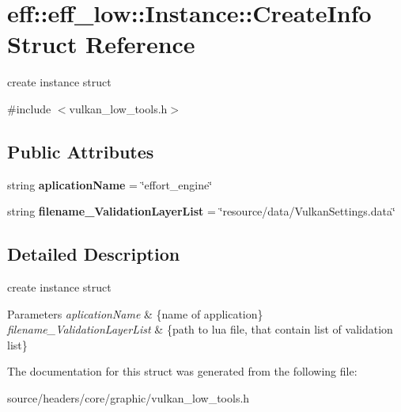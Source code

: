 \hypertarget{structeff_1_1eff__low_1_1Instance_1_1CreateInfo}{}\section{eff\+:\+:eff\+\_\+low\+:\+:Instance\+:\+:Create\+Info Struct Reference}
\label{structeff_1_1eff__low_1_1Instance_1_1CreateInfo}


create instance struct  




{\ttfamily \#include $<$vulkan\+\_\+low\+\_\+tools.\+h$>$}

\subsection*{Public Attributes}
\begin{DoxyCompactItemize}
\item 
\mbox{\label{structeff_1_1eff__low_1_1Instance_1_1CreateInfo_a21317bc2892ba7536c1be0f98d24d8ea}} 
string {\bfseries aplication\+Name} = \char`\"{}effort\+\_\+engine\char`\"{}
\item 
\mbox{\label{structeff_1_1eff__low_1_1Instance_1_1CreateInfo_a45d8c81f575281005cdedd85766c095a}} 
string {\bfseries filename\+\_\+\+Validation\+Layer\+List} = \char`\"{}resource/data/Vulkan\+Settings.\+data\char`\"{}
\end{DoxyCompactItemize}


\subsection{Detailed Description}
create instance struct 


\begin{DoxyParams}{Parameters}
{\em aplication\+Name} & \{name of application\} \\
\hline
{\em filename\+\_\+\+Validation\+Layer\+List} & \{path to lua file, that contain list of validation list\} \\
\hline
\end{DoxyParams}


The documentation for this struct was generated from the following file\+:\begin{DoxyCompactItemize}
\item 
source/headers/core/graphic/vulkan\+\_\+low\+\_\+tools.\+h\end{DoxyCompactItemize}
